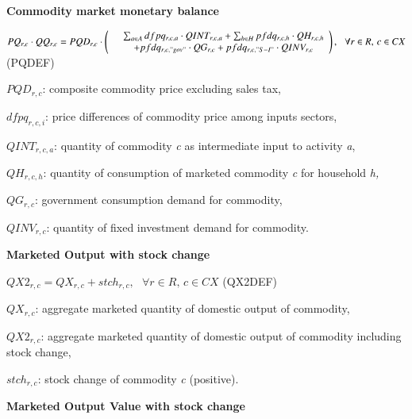\documentclass[10pt,a4paper,titlepage,dvipdfmx]{book}
\begin{document}
\begin{flushleft}\textbf{Commodity market monetary balance}\end{flushleft}


\begin{center}$PQ_{r,c}\cdot QQ_{r,c}=PQD_{r,c}\cdot \left(\begin{array}{cc} & \sum _{a\in A}dfpq_{r,c,a}\cdot QINT_{r,c,a}+\sum _{h\in H}pfdq_{r,c,h}\cdot QH_{r,c,h}\\ & +pfdq_{r,c,"gov"}\cdot QG_{r,c}+pfdq_{r,c,"S-I"}\cdot QINV_{r,c}
\end{array}\right),\,\,\,\,\forall r\in R,\,c\in CX$ (PQDEF)
\end{center}

\begin{flushleft}
$PQD_{r,c}$: composite commodity price excluding sales tax,

$dfpq_{r,c,i}$: price differences of commodity price among inputs sectors,

$QINT_{r,c,a}$: quantity of commodity \textit{c} as intermediate input to activity \textit{a},

$QH_{r,c,h}$: quantity of consumption of marketed commodity \textit{c} for household \textit{h,}

$QG_{r,c}$: government consumption demand for commodity,

$QINV_{r,c}$: quantity of fixed investment demand for commodity.
\end{flushleft}

\begin{flushleft}\textbf{Marketed Output with stock change}\end{flushleft}


\begin{center}$QX2_{r,c}=QX_{r,c}+stch_{r,c},\,\,\,\,\forall r\in R,\,c\in CX$ (QX2DEF)
\end{center}

\begin{flushleft}
$QX_{r,c}$: aggregate marketed quantity of domestic output of commodity,

$QX2_{r,c}$: aggregate marketed quantity of domestic output of commodity including stock change,

$stch_{r,c}$: stock change of commodity \textit{c} (positive).
\end{flushleft}

\begin{flushleft}\textbf{Marketed Output Value with stock change}\end{flushleft}
\end{document}
